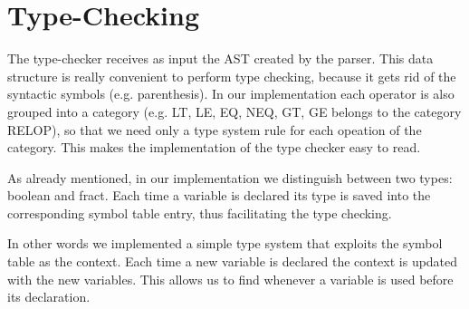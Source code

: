 \section{Type-Checking}
\label{sec:type-checking}

The type-checker receives as input the AST created by the 
parser. This data structure is really convenient to perform
type checking, because it gets rid of the syntactic symbols (e.g. parenthesis).
In our implementation each operator is also grouped into a category 
(e.g. LT, LE, EQ, NEQ, GT, GE belongs to the category RELOP),
so that we need only a type system rule for each opeation of the category.
This makes the implementation of the type checker easy to read.


As already mentioned, in our implementation we distinguish between two types:
boolean and fract. Each time a variable is declared its type is saved into the 
corresponding symbol table entry, thus facilitating the type checking.

In other words we implemented a simple type system that exploits the symbol
table as the context. Each time a new variable is declared 
the context is updated with the new variables. This allows us to find whenever
a variable is used before its declaration.
